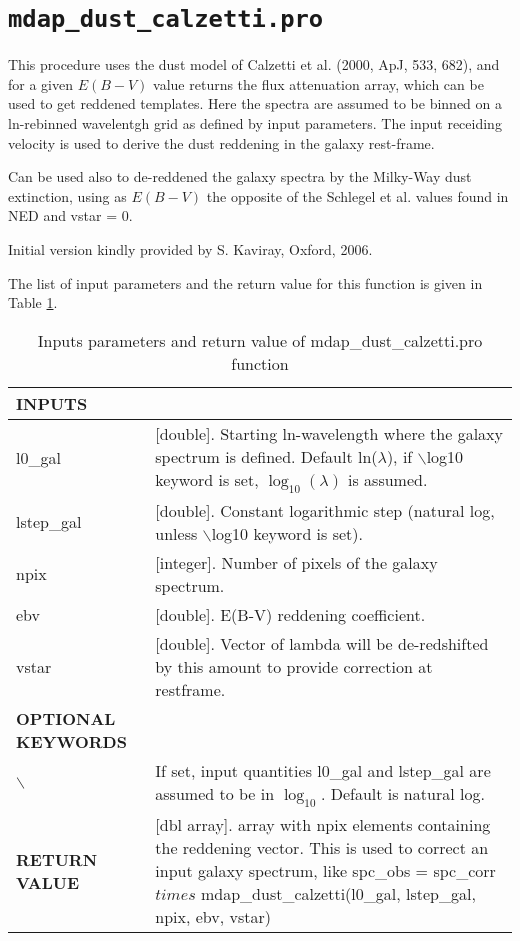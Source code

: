 \section{{\tt mdap\_dust\_calzetti.pro}}
\label{dap_sec:mdap_dust_calzetti}



This procedure uses the dust model of Calzetti et al. (2000, ApJ, 533,
682), and for a given $E(B-V)$ value returns the flux attenuation array,
which can be used to get reddened templates. Here the spectra are
assumed to be binned on a ln-rebinned wavelentgh grid as defined by
input parameters. The input receiding velocity is used to derive the
dust reddening in the galaxy rest-frame.

Can be used also to de-reddened the galaxy spectra by the Milky-Way
dust extinction, using as $E(B-V)$ the opposite of the Schlegel et
al. values found in NED and vstar = 0.

Initial version kindly provided by S. Kaviray, Oxford, 2006.

The list of input parameters and the return value for this function is
given in Table \ref{dap_tab:mdap_dust_calzetti}.

\begin{center}
\begin{longtable}{p{2.7cm}| p{11.1cm}}
\caption{Inputs parameters and return value of mdap\_dust\_calzetti.pro function} \label{dap_tab:mdap_dust_calzetti} \\
\hline
\endfirsthead
\hline
\endhead
\hline
\endlastfoot
\hline
{\bf  INPUTS}  & \\
\hline
l0\_gal & [double]. Starting ln-wavelength where the galaxy spectrum is defined. Default ln($\lambda$), if $\backslash$log10 keyword 
          is set, $\log_{10}(\lambda)$ is assumed. \\
%
lstep\_gal & [double]. Constant logarithmic step (natural log, unless  $\backslash$log10 keyword is set). \\
%
npix & [integer]. Number of pixels of the galaxy spectrum.\\
%
ebv & [double]. E(B-V) reddening coefficient.\\
%
vstar & [double]. Vector of lambda will be de-redshifted by this amount to provide correction at restframe.\\
\hline
{\bf  OPTIONAL KEYWORDS} & \\
$\backslash$ &  If set, input quantities l0\_gal and lstep\_gal are assumed to be in $\log_{10}$. Default is natural log.\\
\hline
{\bf  RETURN VALUE} & [dbl array]. array with npix elements containing the reddening vector. This is used to correct an input galaxy spectrum, like
spc\_obs = spc\_corr $times$ mdap\_dust\_calzetti(l0\_gal, lstep\_gal, npix, ebv, vstar)\\
\end{longtable}
\end{center}
